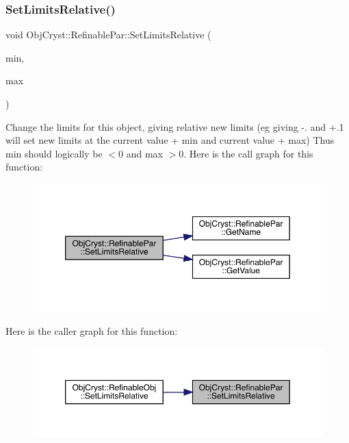 \subsubsection{\texorpdfstring{SetLimitsRelative()}{SetLimitsRelative()}}
{\footnotesize\ttfamily void Obj\+Cryst\+::\+Refinable\+Par\+::\+Set\+Limits\+Relative (\begin{DoxyParamCaption}\item[{const R\+E\+AL}]{min,  }\item[{const R\+E\+AL}]{max }\end{DoxyParamCaption})}

Change the limits for this object, giving relative new limits (eg giving -\/. and +.1 will set new limits at the current value + min and current value + max) Thus min should logically be $<$0 and max $>$0. Here is the call graph for this function\+:
\nopagebreak
\begin{figure}[H]
\begin{center}
\leavevmode
\includegraphics[width=350pt]{class_obj_cryst_1_1_refinable_par_ad445354c927f8df95443a55174e7bb7d_cgraph}
\end{center}
\end{figure}
Here is the caller graph for this function\+:
\nopagebreak
\begin{figure}[H]
\begin{center}
\leavevmode
\includegraphics[width=350pt]{class_obj_cryst_1_1_refinable_par_ad445354c927f8df95443a55174e7bb7d_icgraph}
\end{center}
\end{figure}
\mbox{\label{class_obj_cryst_1_1_refinable_par_a55a87d842fc046b2f4b3c03c92e53052}} 
